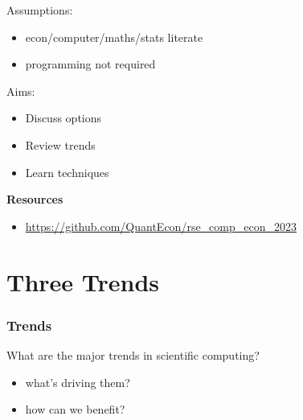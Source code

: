 \documentclass[
    xcolor={svgnames,dvipsnames},
    hyperref={colorlinks, citecolor=DeepPink4, linkcolor=DarkRed, urlcolor=DarkBlue}
    ]{beamer}  %
\newcommand{\1}{\mathbbm 1}
\begin{document}
\begin{frame}


    Assumptions:

    \begin{itemize}
        \item econ/computer/maths/stats literate
        \vspace{0.3em}
        \item programming not required
    \end{itemize}

    \vspace{0.3em}
    \vspace{0.5em}
    Aims:

    \begin{itemize}
        \item Discuss options
        \vspace{0.5em}
        \item Review trends
        \vspace{0.5em}
        \item Learn techniques
    \end{itemize}

    \vspace{0.5em}
    \vspace{0.5em}
    \textbf{Resources}

    \begin{itemize}
        \item \url{https://github.com/QuantEcon/rse_comp_econ_2023}
    \end{itemize}


\end{frame}




\section{Three Trends}

\begin{frame}
    \frametitle{Trends}

    What are the major trends in scientific computing?

    \vspace{0.5em}
    \vspace{0.5em}

    \begin{itemize}
        \item what's driving them?
        \vspace{0.5em}
        \item how can we benefit?
    \end{itemize}
\end{frame}
\end{document}
